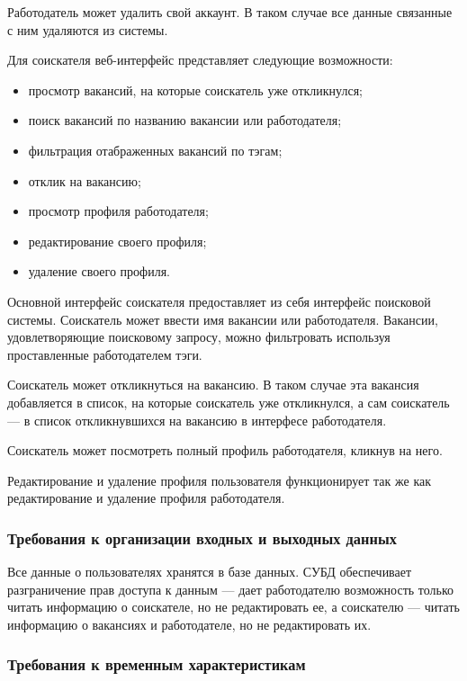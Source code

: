 \documentclass[a4page]{article}
\begin{document}
Работодатель может удалить свой аккаунт. В таком случае все данные связанные с ним удаляются из системы.

Для соискателя веб-интерфейс представляет следующие возможности:

\begin{itemize}
  \item просмотр вакансий, на которые соискатель уже откликнулся;
  \item поиск вакансий по названию вакансии или работодателя;
  \item фильтрация отабраженных вакансий по тэгам;
  \item отклик на вакансию;
  \item просмотр профиля работодателя;
  \item редактирование своего профиля;
  \item удаление своего профиля.
\end{itemize}

Основной интерфейс соискателя предоставляет из себя интерфейс поисковой системы. Соискатель может ввести имя вакансии или работодателя. Вакансии, удовлетворяющие поисковому запросу, можно фильтровать используя проставленные работодателем тэги.

Соискатель может откликнуться на вакансию. В таком случае эта вакансия добавляется в список, на которые соискатель уже откликнулся, а сам соискатель --- в список откликнувшихся на вакансию в интерфесе работодателя.

Соискатель может посмотреть полный профиль работодателя, кликнув на него.

Редактирование и удаление профиля пользователя функционирует так же как редактирование и удаление профиля работодателя.

\subsubsection{Требования к организации входных и выходных данных}

Все данные о пользователях хранятся в базе данных. СУБД обеспечивает разграничение прав доступа к данным --- дает работодателю возможность только читать информацию о соискателе, но не редактировать ее, а соискателю --- читать информацию о вакансиях и работодателе, но не редактировать их.

\subsubsection{Требования к временным характеристикам}
\end{document}

